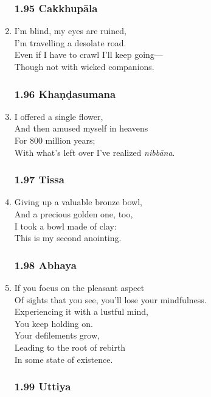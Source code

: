 \documentclass[10pt, openany]{book}
\begin{document}
\begin{enumerate}
\subsubsection*{1.95 Cakkhupāla}

\item I’m blind, my eyes are ruined,\\
I’m travelling a desolate road.\\
Even if I have to crawl I’ll keep going—\\
Though not with wicked companions.

\subsubsection*{1.96 Khaṇḍasumana}

\item I offered a single flower,\\
And then amused myself in heavens\\
For 800 million years;\\
With what’s left over I’ve realized \emph{nibbāna}.

\subsubsection*{1.97 Tissa}

\item Giving up a valuable bronze bowl,\\
And a precious golden one, too,\\
I took a bowl made of clay:\\
This is my second anointing.

\subsubsection*{1.98 Abhaya}

\item If you focus on the pleasant aspect\\
Of sights that you see, you’ll lose your mindfulness.\\
Experiencing it with a lustful mind,\\
You keep holding on.\\
Your defilements grow,\\
Leading to the root of rebirth \\
In some state of existence.

\subsubsection*{1.99 Uttiya}


\end{enumerate}
\end{document}
